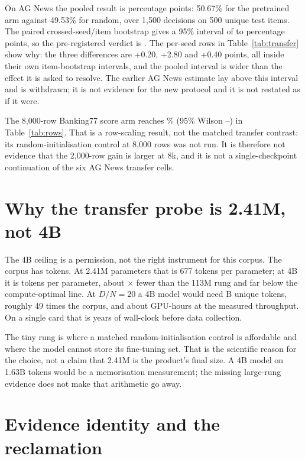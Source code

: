 On AG News the pooled result is \TransferAgGain{} percentage points: 50.67\% for
the pretrained arm against 49.53\% for random, over 1,500 decisions on 500 unique
test items. The paired crossed-seed/item bootstrap gives a 95\% interval of
\TransferAgLo{} to \TransferAgHi{} percentage points, so the pre-registered
verdict is \TransferAgVerdict. The per-seed rows in Table~\ref{tab:transfer}
show why: the three differences are +0.20, +2.80 and +0.40 points, all inside
their own item-bootstrap intervals, and the pooled interval is wider than the
effect it is asked to resolve. The earlier AG News estimate lay above this
interval and is withdrawn; it is not evidence for the new protocol and it is not
restated as if it were.

The 8,000-row Banking77 score arm reaches \ShipAcc\% (95\% Wilson
\ShipLo--\ShipHi) in Table~\ref{tab:rows}. That is a row-scaling result, not the
matched transfer contrast: its random-initialisation control at 8,000 rows was
not run. It is therefore not evidence that the 2,000-row gain is larger at 8k,
and it is not a single-checkpoint continuation of the six AG News transfer cells.

\section{Why the transfer probe is 2.41M, not 4B}
\label{sec:why-241m}

The 4B ceiling is a permission, not the right instrument for this corpus. The
corpus has \CorpusTokens{} tokens. At 2.41M parameters that is 677 tokens per
parameter; at 4B it is \FourBDN{} tokens per parameter, about
\FourBFactor$\times$ fewer than the 113M rung and far below the compute-optimal
line. At $D/N=20$ a 4B model would need \FourBTokensB{}B unique tokens, roughly
49 times the corpus, and about \FourBGPUHours{} GPU-hours at the measured
throughput. On a single card that is years of wall-clock before data collection.

The tiny rung is where a matched random-initialisation control is affordable and
where the model cannot store its fine-tuning set. That is the scientific reason
for the choice, not a claim that 2.41M is the product's final size. A 4B model on
1.63B tokens would be a memorisation measurement; the missing large-rung evidence
does not make that arithmetic go away.

\section{Evidence identity and the reclamation}
\label{sec:reclamation}

